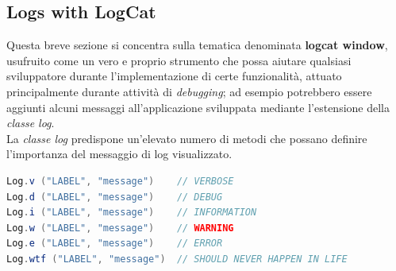 \documentclass{article}
\begin{document}
\subsection*{Logs with LogCat}
Questa breve sezione si concentra sulla tematica denominata \textbf{logcat window}, usufruito come un vero e proprio strumento che possa aiutare qualsiasi sviluppatore durante l'implementazione di certe funzionalità, attuato principalmente durante attività di \textit{debugging}; ad esempio potrebbero essere aggiunti alcuni messaggi all'applicazione sviluppata mediante l'estensione della \textit{classe log}.\vspace*{14pt}\\
La \textit{classe log} predispone un'elevato numero di metodi che possano definire l'importanza del messaggio di log visualizzato.
\begin{lstlisting}[language=JAVA, title=Dichiarazione dei log]
Log.v ("LABEL", "message")    // VERBOSE
Log.d ("LABEL", "message")    // DEBUG
Log.i ("LABEL", "message")    // INFORMATION
Log.w ("LABEL", "message")    // WARNING
Log.e ("LABEL", "message")    // ERROR
Log.wtf ("LABEL", "message")  // SHOULD NEVER HAPPEN IN LIFE
\end{lstlisting}
\end{document}
